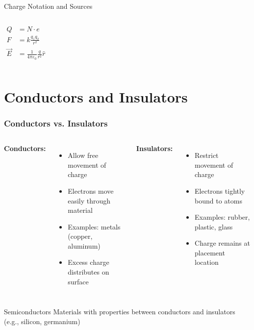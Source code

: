 \documentclass{beamer}
\newcommand{\highlight}[1]{\textcolor{ds9red}{#1}}
\begin{document}
\begin{frame}{Charge Notation and Sources}
\begin{columns}
        \centering
        \begin{align}
            Q &= N \cdot e\\
            F &= k\frac{q_1 q_2}{r^2}\\
            \vec{E} &= \frac{1}{4\pi\varepsilon_0}\frac{q}{r^2}\hat{r}
        \end{align}
        \vspace{0.5cm}
    \end{columns}
\end{frame}

\section{Conductors and Insulators}

\begin{frame}
    \frametitle{Conductors vs. Insulators}
    
    \begin{columns}
        \textbf{Conductors:}
        \begin{itemize}
            \item Allow \highlight{free movement} of charge
            \item Electrons move easily through material
            \item Examples: metals (copper, aluminum)
            \item Excess charge distributes on surface
        \end{itemize}
        
        \textbf{Insulators:}
        \begin{itemize}
            \item \highlight{Restrict movement} of charge
            \item Electrons tightly bound to atoms
            \item Examples: rubber, plastic, glass
            \item Charge remains at placement location
        \end{itemize}
    \end{columns}
    
    \vspace{1em}
    \begin{block}{Semiconductors}
        Materials with properties between conductors and insulators
        (e.g., silicon, germanium)
    \end{block}
\end{frame}
\end{document}
